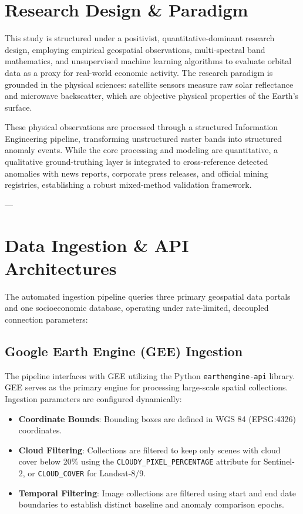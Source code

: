 
\section{Research Design \& Paradigm}
This study is structured under a positivist, quantitative-dominant research design, employing empirical geospatial observations, multi-spectral band mathematics, and unsupervised machine learning algorithms to evaluate orbital data as a proxy for real-world economic activity. The research paradigm is grounded in the physical sciences: satellite sensors measure raw solar reflectance and microwave backscatter, which are objective physical properties of the Earth's surface. 

These physical observations are processed through a structured Information Engineering pipeline, transforming unstructured raster bands into structured anomaly events. While the core processing and modeling are quantitative, a qualitative ground-truthing layer is integrated to cross-reference detected anomalies with news reports, corporate press releases, and official mining registries, establishing a robust mixed-method validation framework.

---

\section{Data Ingestion \& API Architectures}
The automated ingestion pipeline queries three primary geospatial data portals and one socioeconomic database, operating under rate-limited, decoupled connection parameters:

\subsection{Google Earth Engine (GEE) Ingestion}
The pipeline interfaces with GEE utilizing the Python \texttt{earthengine-api} library. GEE serves as the primary engine for processing large-scale spatial collections. Ingestion parameters are configured dynamically:
\begin{itemize}
  \item \textbf{Coordinate Bounds}: Bounding boxes are defined in WGS 84 (EPSG:4326) coordinates.
  \item \textbf{Cloud Filtering}: Collections are filtered to keep only scenes with cloud cover below 20\% using the \texttt{CLOUDY\_PIXEL\_PERCENTAGE} attribute for Sentinel-2, or \texttt{CLOUD\_COVER} for Landsat-8/9.
  \item \textbf{Temporal Filtering}: Image collections are filtered using start and end date boundaries to establish distinct baseline and anomaly comparison epochs.

\end{itemize}
